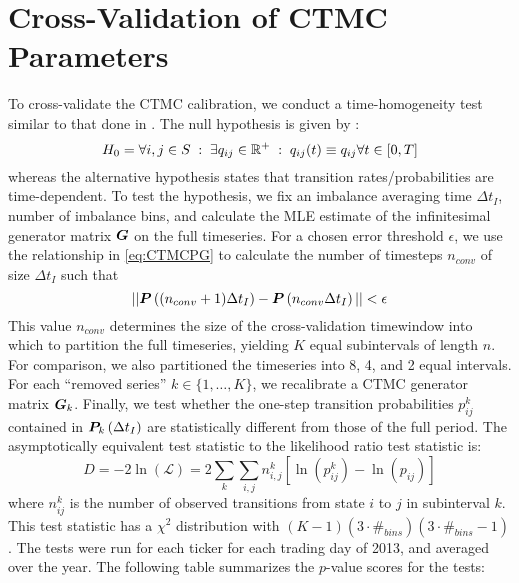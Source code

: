 \section{Cross-Validation of CTMC Parameters}
To cross-validate the CTMC calibration, we conduct a time-homogeneity test similar to that done in \cite{Tan02}. The null hypothesis is given by \cite{Weiss10}:
\begin{equation}
H_0 = \forall i,j \in S \; : \; \exists q_{ij} \in \mathbb{R}^+ \; : \; q_{ij}(t) \equiv q_{ij} \forall t \in [0,T]
\end{equation}
whereas the alternative hypothesis states that transition rates/probabilities are time-dependent. To test the hypothesis, we fix an imbalance averaging time $\Delta t_I$, number of imbalance bins, and calculate the MLE estimate of the infinitesimal generator matrix $\boldsymbol{G}$ on the full timeseries. For a chosen error threshold $\epsilon$, we use the relationship in \eqref{eq:CTMCPG} to calculate the number of timesteps $n_{conv}$ of size $\Delta t_I$ such that
\begin{equation}\label{eq:crossvalidnconv}
|| \boldsymbol{P}\left((n_{conv}+1)\Delta t_I \right) - \boldsymbol{P} \left( n_{conv}\Delta t_I \right) || < \epsilon
\end{equation}
This value $n_{conv}$ determines the size of the cross-validation timewindow into which to partition the full timeseries, yielding $K$ equal subintervals of length $n$. For comparison, we also partitioned the timeseries into 8, 4, and 2 equal intervals. For each ``removed series'' $k \in \{ 1,\dots,K \}$, we recalibrate a CTMC generator matrix $\boldsymbol{G}_{k}$. Finally, we test whether the one-step transition probabilities $p_{ij}^k$ contained in $\boldsymbol{P}_k \left(\Delta t_I \right)$ are statistically different from those of the full period. The asymptotically equivalent test statistic to the likelihood ratio test statistic is:
\begin{equation}
D = -2 \ln (\mathcal{L})  = 2 \sum_k \sum_{i,j} n_{i,j}^k \left[ \ln(p_{ij}^k)  - \ln(p_{ij})   \right]
\end{equation}
where $n_{ij}^k$ is the number of observed transitions from state $i$ to $j$ in subinterval $k$. This test statistic has a $\chi^2$ distribution with $(K-1)(3 \cdot \#_{bins})(3 \cdot \#_{bins} - 1)$. The tests were run for each ticker for each trading day of 2013, and averaged over the year. The following table summarizes the $p$-value scores for the tests:
